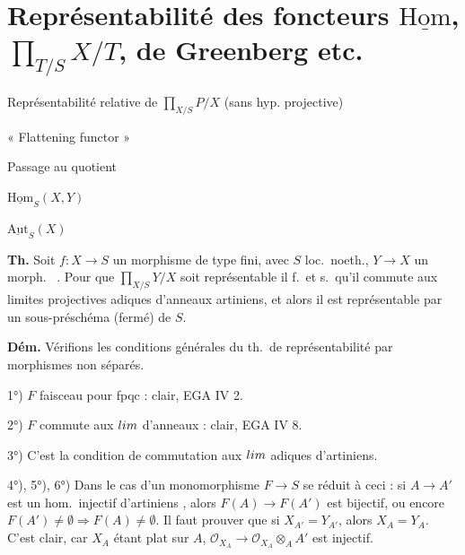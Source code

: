 \documentclass[11pt,a4paper]{article}
\begin{document}
\section{Représentabilité des foncteurs $\underline{\mathrm{Hom}}$, $\prod_{T/S} X/T$, de Greenberg etc.}


Représentabilité relative de $\prod_{X/S} P/X$ (sans hyp. projective)

« Flattening functor »

Passage au quotient

$\underline{\mathrm{Hom}}_S(X,Y)$

$\underline{\mathrm{Aut}}_S(X)$


\textbf{Th.} Soit $f\colon X\to S$ un morphisme  de type fini, avec $S$ loc.\ noeth., $Y\to X$ un morph.\  . Pour que $\prod_{X/S} Y/X$ soit représentable il f.\ et s.\ qu'il commute aux limites projectives adiques d'anneaux artiniens, et  alors il est représentable par un sous-préschéma (fermé) de $S$.


\textbf{Dém.} Vérifions les conditions générales du th.\ de représentabilité par morphismes non  séparés.

1°) $F$ faisceau pour fpqc :  clair, EGA IV 2.

2°) $F$ commute aux $\varinjlim$ d'anneaux : clair, EGA IV 8.


3°) C'est la condition de commutation aux $\varprojlim$ adiques d'artiniens.

4°), 5°), 6°) Dans le cas d'un monomorphisme $F\to S$ se réduit à ceci : si $A\to A'$ est un hom.\ injectif d'artiniens , alors $F(A)\to F(A')$ est bijectif, ou encore $F(A')\neq\emptyset \Rightarrow F(A)\neq\emptyset$. Il faut prouver que si $X_{A'}=Y_{A'}$, alors $X_A=Y_A$. C'est clair, car $X_A$ étant plat sur $A$, $\mathcal{O}_{X_A}\to\mathcal{O}_{X_A}\otimes_A A'$ est injectif.

\end{document}

